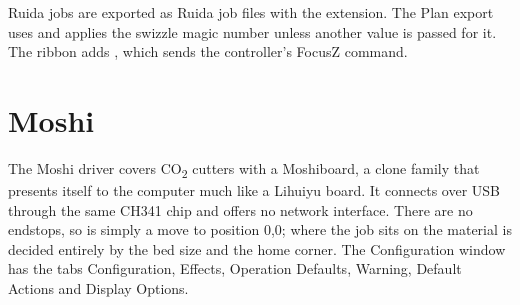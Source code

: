 Ruida jobs are exported as Ruida job files with the  extension. The
Plan export uses  and applies the swizzle magic number
unless another value is passed for it. The ribbon adds , which
sends the controller's FocusZ command.

\section*{Moshi}

The Moshi driver covers CO\textsubscript{2} cutters with a Moshiboard, a clone
family that presents itself to the computer much like a Lihuiyu board. It
connects over USB through the same CH341 chip and offers no network interface.
There are no endstops, so  is simply a move to position 0,0; where the
job sits on the material is decided entirely by the bed size and the home
corner. The Configuration window has the tabs Configuration, Effects, Operation
Defaults, Warning, Default Actions and Display Options.

